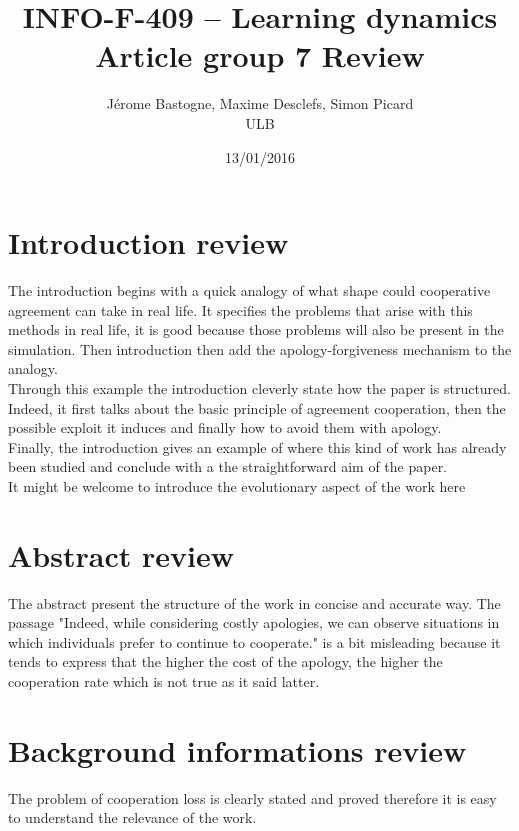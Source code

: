 \documentclass{article}
\title{INFO-F-409 -- Learning dynamics\\Article group 7 Review}
\date{13/01/2016}
\author{Jérome Bastogne, Maxime Desclefs, Simon Picard\\\textsc{ULB}}
\begin{document}
\maketitle

\section{Introduction review}
The introduction begins with a quick analogy of what shape could cooperative agreement can take in real life. It specifies the problems that arise with this methods in real life, it is good because those problems will also be present in the simulation. Then introduction then add the apology-forgiveness mechanism to the analogy.\\
Through this example the introduction cleverly state how the paper is structured. Indeed, it first talks about the basic principle of agreement cooperation, then the possible exploit it induces and finally how to avoid them with apology.\\
Finally, the introduction gives an example of where this kind of work has already been studied and conclude with a the straightforward aim of the paper.\\

It might be welcome to introduce the evolutionary aspect of the work here

\section{Abstract review}
The abstract present the structure of the work in concise and accurate way. The passage "Indeed, while considering costly apologies, we can observe situations in which individuals prefer to continue to cooperate." is a bit misleading because it tends to express that the higher the cost of the apology, the higher the cooperation rate which is not true as it said latter.


\section{Background informations review}
The problem of cooperation loss is clearly stated and proved therefore it is easy to understand the relevance of the work.
\end{document}
